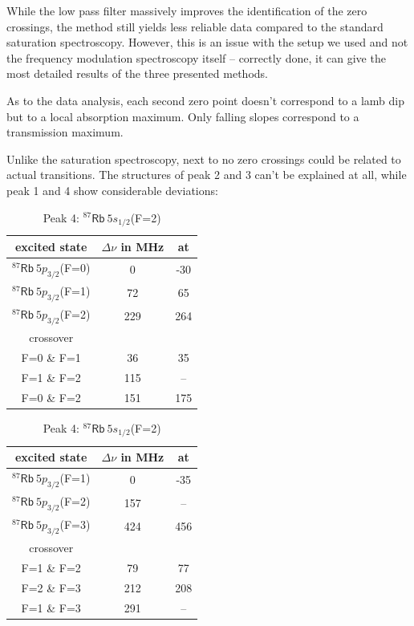 While the low pass filter massively improves the identification of the zero crossings, the method still yields less reliable data compared to the standard saturation spectroscopy. However, this is an issue with the setup we used and not the frequency modulation spectroscopy itself -- correctly done, it can give the most detailed results of the three presented methods.

As to the data analysis, each second zero point doesn't correspond to a lamb dip but to a local absorption maximum. Only falling slopes correspond to a transmission maximum.

Unlike the saturation spectroscopy, next to no zero crossings could be related to actual transitions. The structures of peak 2 and 3 can't be explained at all, while peak 1 and 4 show considerable deviations: 

\begin{table}[h]
   \centering
   \caption{Structure of peak 1 and 4 for frequency modulation spectroscopy}
	\label{tab:dips}
   \begin{subtable}{0.48\textwidth}
	\centering
	\caption{Peak 1: $^{87}\mathsf{Rb}~5s_{1/2}$(F=1)}
	\begin{tabular}{ccc}
		\toprule
		 excited state 					& $\Delta \nu$ in MHz	& at \\
		\midrule
		$^{87}\mathsf{Rb}~5p_{3/2}$(F=0)	& 0					& -30		\\
		$^{87}\mathsf{Rb}~5p_{3/2}$(F=1)	& 72					& 65		\\
		$^{87}\mathsf{Rb}~5p_{3/2}$(F=2)	& 229				& 264	\\[1ex]
		crossover		\\[-0.5ex]
		\midrule
		F=0 \& F=1					& 36					& 35		\\
		F=1 \& F=2					& 115				& --		\\
		F=0 \& F=2					& 151				& 175	\\
		\bottomrule
	\end{tabular}
   \end{subtable}
   \hfill
   \begin{subtable}{0.48\textwidth}
	\centering
	\caption{Peak 4: $^{87}\mathsf{Rb}~5s_{1/2}$(F=2)}
	\begin{tabular}{ccc}
		\toprule
		 excited state 					& $\Delta \nu$ in MHz	& at \\
		\midrule
		$^{87}\mathsf{Rb}~5p_{3/2}$(F=1)	& 0					& -35		\\
		$^{87}\mathsf{Rb}~5p_{3/2}$(F=2)	& 157				& --		\\
		$^{87}\mathsf{Rb}~5p_{3/2}$(F=3)	& 424				& 456	\\[1ex]
		crossover		\\[-0.5ex]
		\midrule
		F=1 \& F=2					& 79					& 77		\\
		F=2 \& F=3					& 212				& 208	\\
		F=1 \& F=3					& 291				& --		\\
		\bottomrule
	\end{tabular}
   \end{subtable}
\vspace{-3em}
\end{table}

